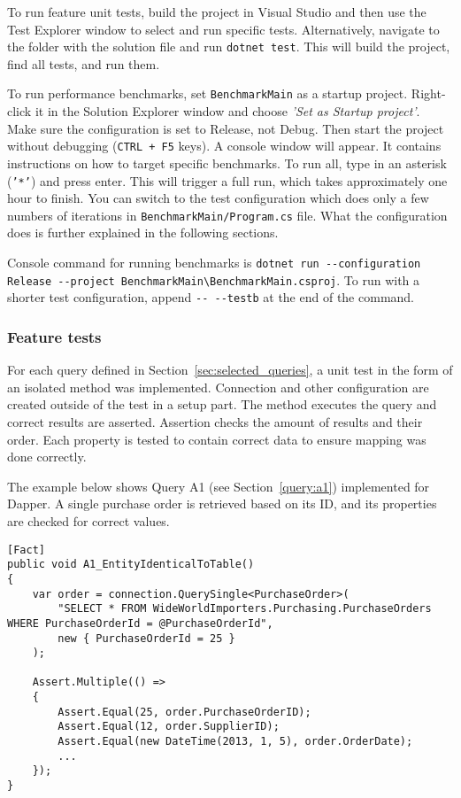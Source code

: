 To run feature unit tests, build the project in Visual Studio and then use the Test Explorer window to select and run specific tests. Alternatively, navigate to the folder with the solution file and run \lstinline{dotnet test}. This will build the project, find all tests, and run them. 

To run performance benchmarks, set \texttt{BenchmarkMain} as a startup project. Right-click it in the Solution Explorer window and choose \textit{'Set as Startup project'}. Make sure the configuration is set to Release, not Debug. Then start the project without debugging (\texttt{CTRL + F5} keys). A console window will appear. It contains instructions on how to target specific benchmarks. To run all, type in an asterisk (\texttt{'*'}) and press enter. This will trigger a full run, which takes approximately one hour to finish. You can switch to the test configuration which does only a few numbers of iterations in \texttt{BenchmarkMain/Program.cs} file. What the configuration does is further explained in the following sections. 

Console command for running benchmarks is \lstinline{dotnet run --configuration Release --project BenchmarkMain\BenchmarkMain.csproj}. To run with a shorter test configuration, append \lstinline{-- --testb} at the end of the command.

\subsubsection{Feature tests}
For each query defined in Section~\ref{sec:selected_queries}, a unit test in the form of an isolated method was implemented. Connection and other configuration are created outside of the test in a setup part. The method executes the query and correct results are asserted. Assertion checks the amount of results and their order. Each property is tested to contain correct data to ensure mapping was done correctly.

The example below shows Query A1 (see Section~\ref{query:a1}) implemented for Dapper. A single purchase order is retrieved based on its ID, and its properties are checked for correct values. 
\begin{lstlisting}[language=CSharp]
[Fact]
public void A1_EntityIdenticalToTable()
{
    var order = connection.QuerySingle<PurchaseOrder>(
        "SELECT * FROM WideWorldImporters.Purchasing.PurchaseOrders WHERE PurchaseOrderId = @PurchaseOrderId",
        new { PurchaseOrderId = 25 }
    );

    Assert.Multiple(() =>
    {
        Assert.Equal(25, order.PurchaseOrderID);
        Assert.Equal(12, order.SupplierID);
        Assert.Equal(new DateTime(2013, 1, 5), order.OrderDate);
        ...
    });
}
\end{lstlisting}

